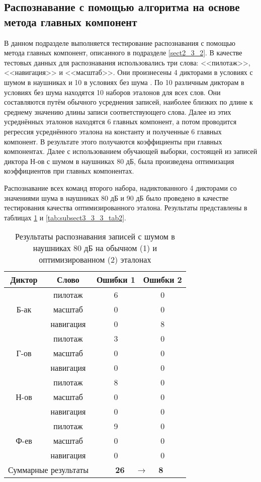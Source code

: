 \subsection{Распознавание с помощью алгоритма на основе метода главных компонент} \label{sect3_3_3}

В данном подразделе выполняется тестирование распознавания с помощью метода главных компонент, описанного в подразделе \ref{sect2_3_2}.
В качестве тестовых данных для распознавания использовались три слова: <<пилотаж>>, <<навигация>> и <<масштаб>>.
Они произнесены 4 дикторами в условиях с шумом в наушниках и 10 в условиях без шума \cite{korsun2014algo, korsun2012method, schmidt2000speech}.
По 10 различным дикторам в условиях без шума находятся 10 наборов эталонов для всех слов.
Они составляются путём обычного усреднения записей, наиболее близких по длине к среднему значению длины записи соответствующего слова.
Далее из этих усреднённых эталонов находятся 6 главных компонент, а потом проводится регрессия усреднённого эталона на константу и полученные 6 главных компонент.
В результате этого получаются коэффициенты при главных компонентах.
Далее с использованием обучающей выборки, состоящей из записей диктора Н-ов с шумом в наушниках 80 дБ, была произведена оптимизация коэффициентов при главных компонентах.

Распознавание всех команд второго набора, надиктованного 4 дикторами со значениями шума в наушниках 80 дБ и 90 дБ было проведено в качестве тестирования качества оптимизированного эталона.
Результаты представлены в таблицах \ref{tab:subsect3_3_3_tab1} и \ref{tab:subsect3_3_3_tab2}.

\begin{table}[h]
	\centering
	\caption{Результаты распознавания записей с шумом в наушниках 80 дБ на обычном (1) и оптимизированном (2) эталонах}
	\label{tab:subsect3_3_3_tab1}
	\begin{tabular}{| c | c | c | c |}
		\hline
		\phantom{000} Диктор \phantom{000} & \phantom{000000} Слово \phantom{000000} & \phantom{000} Ошибки 1 \phantom{000} & \phantom{000} Ошибки 2 \phantom{000} \\
		\hline
				& пилотаж	& 6 & 0 \\
		Б-ак	& масштаб   & 0 & 0 \\
				& навигация & 0 & 8 \\
		\hline
				& пилотаж	& 3 & 0 \\
		Г-ов	& масштаб   & 0 & 0 \\
				& навигация & 0 & 0 \\
		\hline
				& пилотаж	& 8 & 0 \\
		Н-ов	& масштаб   & 0 & 0 \\
				& навигация & 0 & 0 \\
		\hline
				& пилотаж	& 9 & 0 \\
		Ф-ев	& масштаб   & 0 & 0 \\
				& навигация & 0 & 0 \\
		\hline
		\multicolumn{2}{|c|}{Суммарные результаты} & \multicolumn{2}{c|}{\textbf{26} $\quad\longrightarrow\quad$ \textbf{8}} \\
		\hline
	\end{tabular}
\end{table}

